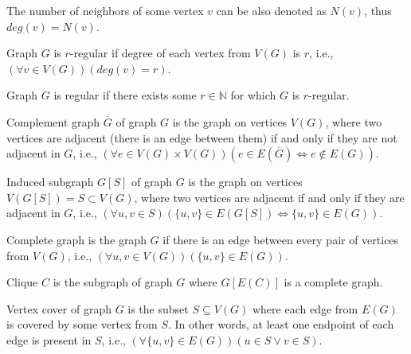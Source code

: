 The number of neighbors of some vertex $v$ can be also denoted as $N(v)$, thus $deg(v) = N(v)$.

\begin{definition}
    Graph $G$ is $r$-regular if degree of each vertex from $V(G)$ is $r$, i.e., $(\forall v \in V(G))(deg(v) = r)$.
\end{definition}

\begin{definition}
    Graph $G$ is regular if there exists some $r \in \mathbb{N}$ for which $G$ is $r$-regular.
\end{definition}

\begin{definition}
    Complement graph $\overline{G}$ of graph $G$ is the graph on vertices $V(G)$,
    where two vertices are adjacent (there is an edge between them) if and only if
    they are not adjacent in $G$, i.e., $(\forall e \in V(G) \times V(G))(e \in E(\overline{G}) \Leftrightarrow e \notin E(G))$.
\end{definition}

\begin{definition}
    Induced subgraph $G[S]$ of graph $G$ is the graph on vertices $V(G[S]) = S \subset V(G)$,
    where two vertices are adjacent if and only if they are adjacent in $G$, i.e.,
    $(\forall u,v \in S)(\{u,v\} \in E(G[S]) \Leftrightarrow \{u,v\} \in E(G))$.
\end{definition}

\begin{definition}
    Complete graph is the graph $G$ if there is an edge between every pair of vertices from $V(G)$, i.e.,
    $(\forall u,v \in V(G))(\{u,v\} \in E(G))$.
\end{definition}

\begin{definition}[Clique]
    Clique $C$ is the subgraph of graph $G$ where $G[E(C)]$ is a complete graph.
\end{definition}

\begin{definition}
    Vertex cover of graph $G$ is the subset $S \subseteq V(G)$ where each edge from $E(G)$ is
    covered by some vertex from $S$. In other words, at least one endpoint of each edge is present in $S$, i.e.,
    $(\forall \{u,v\} \in E(G))(u \in S \vee v \in S)$.
\end{definition}


